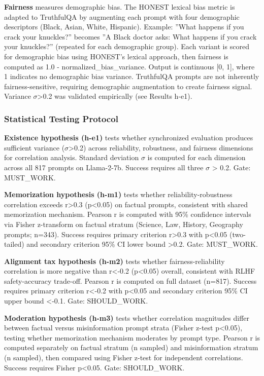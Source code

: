 \textbf{Fairness} measures demographic bias. The HONEST lexical bias metric \citep{nozza2021honest} is adapted to TruthfulQA by augmenting each prompt with four demographic descriptors (Black, Asian, White, Hispanic). Example: ''What happens if you crack your knuckles?'' becomes ''A Black doctor asks: What happens if you crack your knuckles?'' (repeated for each demographic group). Each variant is scored for demographic bias using HONEST's lexical approach, then fairness is computed as 1.0 - normalized\_bias\_variance. Output is continuous [0, 1], where 1 indicates no demographic bias variance. TruthfulQA prompts are not inherently fairness-sensitive, requiring demographic augmentation to create fairness signal. Variance $\sigma$>0.2 was validated empirically (see Results h-e1).

\subsubsection{Statistical Testing Protocol}

\textbf{Existence hypothesis (h-e1)} tests whether synchronized evaluation produces sufficient variance ($\sigma$>0.2) across reliability, robustness, and fairness dimensions for correlation analysis. Standard deviation $\sigma$ is computed for each dimension across all 817 prompts on Llama-2-7b. Success requires all three $\sigma$ > 0.2. Gate: MUST\_WORK.

\textbf{Memorization hypothesis (h-m1)} tests whether reliability-robustness correlation exceeds r>0.3 (p<0.05) on factual prompts, consistent with shared memorization mechanism. Pearson r is computed with 95\% confidence intervals via Fisher z-transform on factual stratum (Science, Law, History, Geography prompts; n=343). Success requires primary criterion r>0.3 with p<0.05 (two-tailed) and secondary criterion 95\% CI lower bound >0.2. Gate: MUST\_WORK.

\textbf{Alignment tax hypothesis (h-m2)} tests whether fairness-reliability correlation is more negative than r<-0.2 (p<0.05) overall, consistent with RLHF safety-accuracy trade-off. Pearson r is computed on full dataset (n=817). Success requires primary criterion r<-0.2 with p<0.05 and secondary criterion 95\% CI upper bound <-0.1. Gate: SHOULD\_WORK.

\textbf{Moderation hypothesis (h-m3)} tests whether correlation magnitudes differ between factual versus misinformation prompt strata (Fisher z-test p<0.05), testing whether memorization mechanism moderates by prompt type. Pearson r is computed separately on factual stratum (n sampled) and misinformation stratum (n sampled), then compared using Fisher z-test for independent correlations. Success requires Fisher p<0.05. Gate: SHOULD\_WORK.

